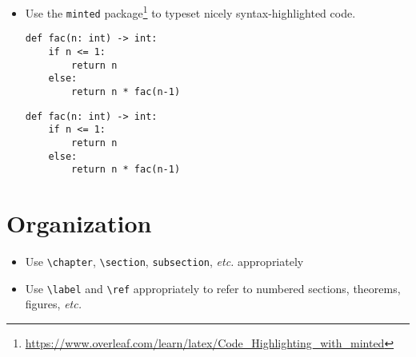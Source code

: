 \documentclass{article}
\begin{document}
\begin{itemize}
\item Use the \texttt{minted}
  package\footnote{\url{https://www.overleaf.com/learn/latex/Code_Highlighting_with_minted}}
  to typeset nicely syntax-highlighted code.
  \begin{bad}
\begin{verbatim}
def fac(n: int) -> int:
    if n <= 1:
        return n
    else:
        return n * fac(n-1)
\end{verbatim}
  \end{bad}
  \begin{good}
\begin{verbatim}
def fac(n: int) -> int:
    if n <= 1:
        return n
    else:
        return n * fac(n-1)
\end{verbatim}
  \end{good}
\end{itemize}

\section*{Organization}

\begin{itemize}
\item Use \verb|\chapter|, \verb|\section|, \verb|subsection|,
  \emph{etc.} appropriately
\item Use \verb|\label| and \verb|\ref| appropriately to refer to
  numbered sections, theorems, figures, \emph{etc.}
\end{itemize}
\end{document}
